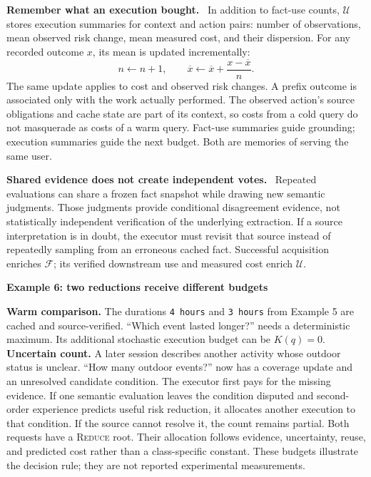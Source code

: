 \documentclass[10pt,twocolumn]{article}
\newcommand{\Ff}{\mathcal{F}}
\newcommand{\Uu}{\mathcal{U}}
\newcommand{\red}{\textsc{Reduce}}
\newcommand{\runin}[1]{\smallskip\noindent\textbf{#1.}\ }
\newenvironment{memoryexample}[1]{%
  \def\FrameCommand{\fboxrule=0.7pt\fboxsep=6pt\fbox}%
  \begin{framed}\small\noindent\textbf{#1}\par\smallskip
}{\end{framed}}
\begin{document}
\runin{Remember what an execution bought}
In addition to fact-use counts, $\Uu$ stores execution summaries for
context and action pairs: number of observations, mean observed risk
change, mean measured cost, and their dispersion. For any recorded
outcome $x$, its mean is updated incrementally:
\begin{equation}
\label{eq:new-mean-update}
n\leftarrow n+1,\qquad
\overline{x}\leftarrow\overline{x}
                    +\frac{x-\overline{x}}{n}.
\end{equation}
The same update applies to cost and observed risk changes. A prefix
outcome is associated only with the work actually performed. The
observed action's source obligations and cache state are part of its
context, so costs from a cold query do not masquerade as costs of a
warm query. Fact-use summaries guide grounding; execution summaries
guide the next budget. Both are memories of serving the same user.

\runin{Shared evidence does not create independent votes}
Repeated evaluations can share a frozen fact snapshot while drawing
new semantic judgments. Those judgments provide conditional
disagreement evidence, not statistically independent verification of
the underlying extraction. If a source interpretation is in doubt,
the executor must revisit that source instead of repeatedly sampling
from an erroneous cached fact. Successful acquisition enriches $\Ff$;
its verified downstream use and measured cost enrich $\Uu$.

\begin{memoryexample}{Example 6: two reductions receive different budgets}
\textbf{Warm comparison.} The durations \texttt{4 hours} and
\texttt{3 hours} from Example 5 are cached and source-verified.
``Which event lasted longer?'' needs a deterministic maximum. Its
additional stochastic execution budget can be $K(q)=0$.
\smallskip
\textbf{Uncertain count.} A later session describes another activity
whose outdoor status is unclear. ``How many outdoor events?'' now has
a coverage update and an unresolved candidate condition. The executor
first pays for the missing evidence. If one semantic evaluation leaves
the condition disputed and second-order experience predicts useful
risk reduction, it allocates another execution to that condition.
If the source cannot resolve it, the count remains partial.
\smallskip
Both requests have a \red{} root. Their allocation follows evidence,
uncertainty, reuse, and predicted cost rather than a class-specific
constant. These budgets illustrate the decision rule; they are not
reported experimental measurements.
\end{memoryexample}
\end{document}

